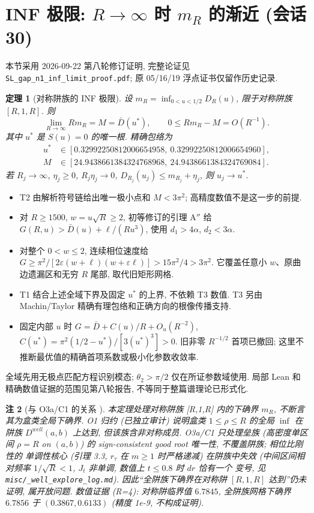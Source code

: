 \documentclass[UTF8]{ctexart}
\newtheorem{theorem}{定理}[section]
\newtheorem{remark}[theorem]{注}
\begin{document}
\section{INF 极限: \texorpdfstring{$R\to\infty$}{R to infinity} 时 \texorpdfstring{$m_R$}{m-R} 的渐近 (会话 30)}

本节采用 2026-09-22 第八轮修订证明, 完整论证见
\texttt{SL\_gap\_n1\_inf\_limit\_proof.pdf}; 原 05/16/19 浮点证书仅留作历史记录.

\begin{theorem}[对称阱族的 INF 极限]
设 $m_R=\inf_{0<u<1/2}D_R(u)$, 限于对称阱族 $[R,1,R]$. 则
\[
 \lim_{R\to\infty}Rm_R=M=\bar D(u^*),\qquad
 0\le Rm_R-M=O(R^{-1}).
\]
其中 $u^*$ 是 $S(u)=0$ 的唯一根. 精确包络为
\begin{align*}
 u^*&\in[0.32992250812006654958,\ 0.32992250812006654960],\\
 M&\in[24.9438661384324768968,\ 24.9438661384324769084].
\end{align*}
若 $R_j\to\infty$, $\eta_j\ge0$, $R_j\eta_j\to0$,
$D_{R_j}(u_j)\le m_{R_j}+\eta_j$, 则 $u_j\to u^*$.
\end{theorem}

\begin{itemize}
 \item T2 由解析符号链给出唯一极小点和 $M<3\pi^2$; 高精度数值不是这一步的前提.
 \item 对 $R\ge1500$, $w=u\sqrt R\ge2$, 初等修订的引理 A$''$ 给
 $G(R,u)>\bar D(u)+\ell/(Ru^3)$, 使用 $d_1>4\alpha$, $d_2<3\alpha$.
 \item 对整个 $0<w\le2$, 连续相位速度给
 $G\ge\pi^2/[2\varepsilon(w+\ell)(w+\varepsilon\ell)]>15\pi^2/4>3\pi^2$.
 它覆盖任意小 $w$、原曲边遗漏区和无穷 $R$ 尾部, 取代旧矩形网格.
 \item T1 结合上述全域下界及固定 $u^*$ 的上界, 不依赖 T3 数值.
 T3 另由 Machin/Taylor 精确有理包络和正确方向的根像传播支持.
 \item 固定内部 $u$ 时 $G=\bar D+C(u)/R+O_u(R^{-2})$,
 $C(u^*)=\pi^2(1/2-u^*)/[3(u^*)^3]>0$. 旧非零 $R^{-1/2}$ 首项已撤回;
 这里不推断最优值的精确首项系数或极小化参数收敛率.
\end{itemize}
全域先用无极点匹配方程识别模态; $\theta_2>\pi/2$ 仅在所证参数域使用.
局部 Lean 和精确数值证据的范围见第八轮报告, 不等同于整篇谱理论已形式化.

\begin{remark}[与 O3a/C1 的关系 \label{rem:inf-gap}]
本定理处理对称阱族 [R,1,R] 内的下确界 $m_R$, \emph{不}断言其为盒类全局下确界.
O1 归约 (已独立审计) 说明盒类 $1\le\rho\le R$ 的全局 $\inf$ 在阱族 $D^{well}(a,b)$
上达到, 但该族含非对称成员. O3a/C1 只处理\emph{垒族} (高密度单区间 $\rho=R$ on
$(a,b)$) 的 sign-consistent good root 唯一性, \emph{不}覆盖阱族; 相位比刚性的
单调性核心 (引理 3.3, $r_\tau$ 在 $m\ge1$ 时严格递减) 在阱族中失效
(中间区间相对频率 $1/\sqrt R<1$, $J_t$ 非单调, 数值上 $t\le0.8$ 时 $dr$ 恰有一个
变号, 见 \texttt{misc/\_well\_explore\_log.md}). 因此``全阱族下确界在对称阱
$[R,1,R]$ 达到''仍未证明, 属开放问题. 数值证据 (R=4): 对称阱临界值 $6.7845$,
全阱族网格下确界 $6.7856$ 于 $(0.3867,0.6133)$ (精度 1e-9, 不构成证明).
\end{remark}
\end{document}
